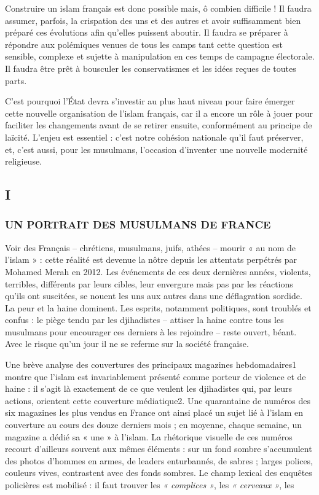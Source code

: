 Construire un islam français est donc possible mais, ô combien difficile
! Il faudra assumer, parfois, la crispation des uns et des autres et
avoir suffisamment bien préparé ces évolutions afin qu'elles puissent
aboutir. Il faudra se préparer à répondre
aux polémiques venues de tous les camps tant cette question est
sensible, complexe et sujette à manipulation en ces temps de campagne
électorale. Il faudra être prêt à bousculer les conservatismes et les
idées reçues de toutes parts.

C'est pourquoi l'État devra s'investir au plus haut niveau pour faire
émerger cette nouvelle organisation de l'islam français, car il a encore
un rôle à jouer pour faciliter les changements avant de se retirer
ensuite, conformément au principe de laïcité. L'enjeu est essentiel :
c'est notre cohésion nationale qu'il faut préserver, et, c'est aussi,
pour les musulmans, l'occasion d'inventer une nouvelle modernité
religieuse.


\hypertarget{i}{%
\subsection{I}\label{i}}

\hypertarget{un-portrait-des-musulmans-de-france}{%
\subsubsection{UN PORTRAIT DES MUSULMANS DE
FRANCE}\label{un-portrait-des-musulmans-de-france}}


Voir des Français -- chrétiens, musulmans, juifs, athées -- mourir « au
nom de l'islam » : cette réalité est devenue la nôtre depuis les
attentats perpétrés par Mohamed Merah en 2012. Les événements de ces
deux dernières années, violents, terribles, différents par leurs cibles,
leur envergure mais pas par les réactions qu'ils ont suscitées, se
nouent les uns aux autres dans une déflagration sordide. La peur et la
haine dominent. Les esprits, notamment politiques, sont troublés et
confus : le piège tendu par les djihadistes -- attiser la haine contre
tous les musulmans pour encourager ces derniers à les rejoindre -- reste
ouvert, béant. Avec le risque qu'un jour il ne se referme sur la société
française.

Une brève analyse des couvertures des principaux magazines
hebdomadaires1 montre que l'islam est invariablement présenté comme
porteur de violence et de haine : il s'agit là exactement de ce que
veulent les djihadistes qui, par leurs actions, orientent cette
couverture médiatique2. Une quarantaine de numéros des six magazines les
plus vendus en France ont ainsi placé un sujet lié à l'islam en
couverture au cours des douze derniers mois ; en moyenne, chaque
semaine, un magazine a dédié sa « une » à l'islam. La rhétorique
visuelle de ces numéros recourt d'ailleurs souvent aux mêmes éléments :
sur un fond sombre s'accumulent des photos d'hommes en armes, de leaders
enturbannés, de sabres ; larges polices, couleurs vives, contrastent
avec des fonds sombres. Le champ lexical des enquêtes policières est
mobilisé : il faut trouver les \emph{« complices »}, les \emph{«
cerveaux »}, les

